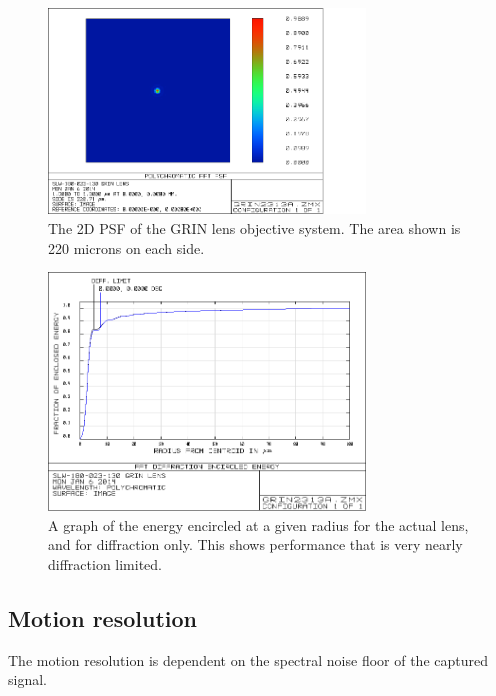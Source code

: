 \begin{figure}[h!]
\centering
\includegraphics[width=0.75\textwidth]{Images/Zemax/GRO-psf.png}
\caption{The 2D PSF of the GRIN lens objective system. The area shown is 220 microns on each side.}
\end{figure}

\begin{figure}[h!]
\centering
\includegraphics[width=0.75\textwidth]{Images/Zemax/GRO-encircledenergy.png}
\caption{A graph of the energy encircled at a given radius for the actual lens, and for diffraction only. This shows performance that is very nearly diffraction limited.}
\end{figure}

\subsection{Motion resolution}
\label{sec:motion_res}

The motion resolution is dependent on the spectral noise floor of the captured signal.